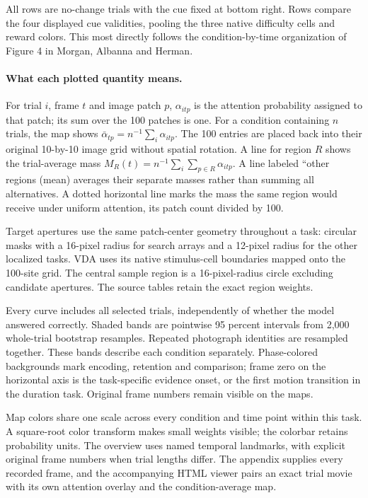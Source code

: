 \documentclass[11pt]{article}
\begin{document}
All rows are no-change trials with the cue fixed at bottom right. Rows compare the four displayed cue validities, pooling the three native difficulty cells and reward colors. This most directly follows the condition-by-time organization of Figure 4 in Morgan, Albanna and Herman.

\paragraph{What each plotted quantity means.}
For trial $i$, frame $t$ and image patch $p$, $\alpha_{itp}$ is the attention probability assigned to that patch; its sum over the 100 patches is one. For a condition containing $n$ trials, the map shows $\bar\alpha_{tp}=n^{-1}\sum_i\alpha_{itp}$. The 100 entries are placed back into their original 10-by-10 image grid without spatial rotation. A line for region $R$ shows the trial-average mass $M_R(t)=n^{-1}\sum_i\sum_{p\in R}\alpha_{itp}$. A line labeled ``other regions (mean) averages their separate masses rather than summing all alternatives. A dotted horizontal line marks the mass the same region would receive under uniform attention, its patch count divided by 100.

Target apertures use the same patch-center geometry throughout a task: circular masks with a 16-pixel radius for search arrays and a 12-pixel radius for the other localized tasks. VDA uses its native stimulus-cell boundaries mapped onto the 100-site grid. The central sample region is a 16-pixel-radius circle excluding candidate apertures. The source tables retain the exact region weights.

Every curve includes all selected trials, independently of whether the model answered correctly. Shaded bands are pointwise 95 percent intervals from 2,000 whole-trial bootstrap resamples. Repeated photograph identities are resampled together. These bands describe each condition separately. Phase-colored backgrounds mark encoding, retention and comparison; frame zero on the horizontal axis is the task-specific evidence onset, or the first motion transition in the duration task. Original frame numbers remain visible on the maps.

Map colors share one scale across every condition and time point within this task. A square-root color transform makes small weights visible; the colorbar retains probability units. The overview uses named temporal landmarks, with explicit original frame numbers when trial lengths differ. The appendix supplies every recorded frame, and the accompanying HTML viewer pairs an exact trial movie with its own attention overlay and the condition-average map.
\end{document}
